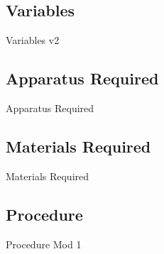 



\subsection{{Variables}}

	{Variables v2}

\subsection{{Apparatus Required}}

	{Apparatus Required}

\subsection{{Materials Required}}

	{Materials Required}

\subsection{{Procedure}}

	{Procedure Mod 1}


